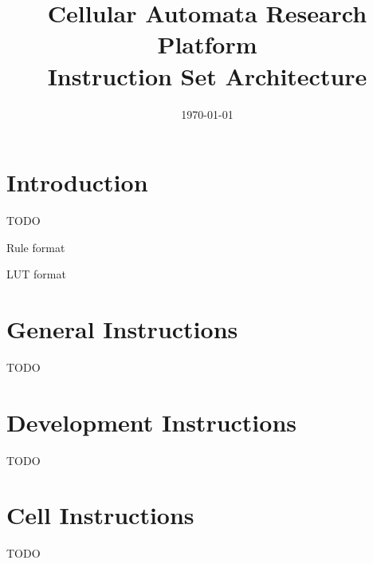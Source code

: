 \documentclass[a4paper]{article}
\title{Cellular Automata Research Platform\\Instruction Set Architecture}
\date{\today}
\begin{document}
\maketitle

\tableofcontents

\newpage

\setcounter{page}{1}

\section{Introduction}

TODO

Rule format

LUT format

\section{General Instructions}

TODO









\section{Development Instructions}

TODO









\section{Cell Instructions}

TODO












\end{document}
